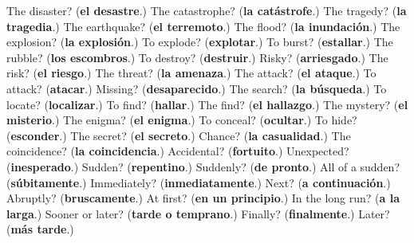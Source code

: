 \begin{tcolorbox}[breakable,colback=teal!4,colframe=teal!35!black,title={Before you move on}]
The disaster? (\textbf{el desastre}.) The catastrophe? (\textbf{la catástrofe}.) The tragedy? (\textbf{la tragedia}.) The earthquake? (\textbf{el terremoto}.) The flood? (\textbf{la inundación}.) The explosion? (\textbf{la explosión}.) To explode? (\textbf{explotar}.) To burst? (\textbf{estallar}.) The rubble? (\textbf{los escombros}.) To destroy? (\textbf{destruir}.) Risky? (\textbf{arriesgado}.) The risk? (\textbf{el riesgo}.) The threat? (\textbf{la amenaza}.) The attack? (\textbf{el ataque}.) To attack? (\textbf{atacar}.) Missing? (\textbf{desaparecido}.) The search? (\textbf{la búsqueda}.) To locate? (\textbf{localizar}.) To find? (\textbf{hallar}.) The find? (\textbf{el hallazgo}.) The mystery? (\textbf{el misterio}.) The enigma? (\textbf{el enigma}.) To conceal? (\textbf{ocultar}.) To hide? (\textbf{esconder}.) The secret? (\textbf{el secreto}.) Chance? (\textbf{la casualidad}.) The coincidence? (\textbf{la coincidencia}.) Accidental? (\textbf{fortuito}.) Unexpected? (\textbf{inesperado}.) Sudden? (\textbf{repentino}.) Suddenly? (\textbf{de pronto}.) All of a sudden? (\textbf{súbitamente}.) Immediately? (\textbf{inmediatamente}.) Next? (\textbf{a continuación}.) Abruptly? (\textbf{bruscamente}.) At first? (\textbf{en un principio}.) In the long run? (\textbf{a la larga}.) Sooner or later? (\textbf{tarde o temprano}.) Finally? (\textbf{finalmente}.) Later? (\textbf{más tarde}.)
\end{tcolorbox}
